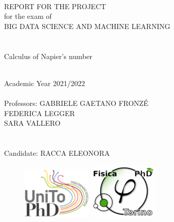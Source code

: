\documentclass[11pt,a4paper]{article}
\begin{document}
\thispagestyle{empty}

\rmfamily
\begin{center}
\ \\
\vspace{2cm}

\LARGE{\textcolor[rgb]{1,0,0}{REPORT FOR THE PROJECT\\ for the exam of\\BIG DATA SCIENCE AND MACHINE LEARNING}\\}
\hrulefill \\
\huge{\textcolor[rgb]{1,0,0}{\ \\Calculus of Napier's number}\\}
\hrulefill \\
\vspace{1.5cm}

\Large{Academic Year 2021/2022
\\ \ \\
Professors: GABRIELE GAETANO FRONZÉ\\
FEDERICA LEGGER\hspace{4.2cm} \\
\hspace{-1cm}SARA VALLERO\hspace{15.2cm} \\
\ \\ \ \\ 
Candidate: RACCA ELEONORA}

\vspace{5cm}
\begin{figure}[h]
\centering
	\includegraphics[width=0.3\textwidth]{../Images/ScuolaDottoratoUnito.pdf} 
	\hspace{5mm} 
	\includegraphics[width=0.3\textwidth]{../Images/ScuolaDottoratoFisica.pdf}
\end{figure}

\end{center}
\end{document}
